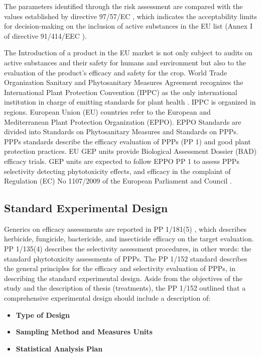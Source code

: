 \documentclass[12pt,a4paper,oneside]{report}
\begin{document}
The parameters identified through the risk assessment are compared with the values 
established by directive 97/57/EC \cite{EURLex1997265}, which indicates the acceptability limits for 
decision-making on the inclusion of active substances in the EU list (Annex I of 
directive 91/414/EEC \cite{directive_91_414_EEC}).

The Introduction of a product in the EU market is not only subject to audits on
active substances and their safety for humans and environment but also to the evaluation 
of the product's efficacy and safety for the crop.
World Trade Organization Sanitary and Phytosanitary Measures Agreement \cite{WTO_SPS_Agreement}
recognizes the International Plant Protection Convention (IPPC) as the only international
institution in charge of emitting standards for plant health \cite{IPPC}. IPPC is organized in
regions. European Union (EU) countries refer to the European and Mediterranean Plant
Protection Organization (EPPO). EPPO Standards are divided into Standards on
Phytosanitary Measures and Standards on PPPs. PPPs standards describe the efficacy
evaluation of PPPs (PP 1) and good plant protection practices. EU GEP units provide
Biological Assessment Dossier (BAD) efficacy trials. GEP units are expected to follow
EPPO PP 1 to assess PPPs selectivity detecting phytotoxicity effects, and efficacy in the
complaint of Regulation (EC) No 1107/2009 of the European Parliament and Council \cite{EC_Regulation_1107_2009}.

\subsection{Standard Experimental Design}

Generics on efficacy assessments are reported in PP 1/181(5) \cite{EPPO_PP1_181}, which describes
herbicide, fungicide, bactericide, and insecticide efficacy on the target evaluation.
PP 1/135(4) \cite{EPPO_PP1_135} describes the selectivity assessment procedures, 
in other words: the standard phytotoxicity assessments of PPPs.
The PP 1/152 \cite{EPPO_PP1_152} standard describes the general principles for the
efficacy and selectivity evaluation of PPPs, in describing the standard experimental design.
Aside from the objectives of the study and the description of thesis (treatments), 
the PP 1/152 outlined that a comprehensive experimental design should include a description of:
\begin{itemize}
    \item \textbf{Type of Design}
    \item \textbf{Sampling Method and Measures Units}
    \item \textbf{Statistical Analysis Plan}
\end{itemize}
\end{document}
